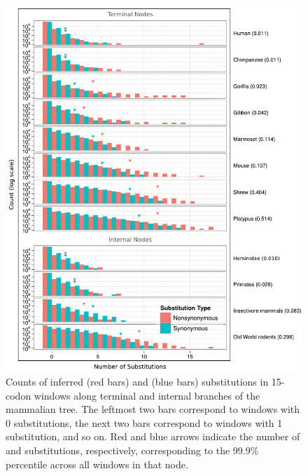 \begin{figure}
\centering \includegraphics[scale=0.75]{Figs/wcs_15.pdf}
\caption{Counts of inferred \nsyn (red bars) and \syn (blue bars)
  substitutions in 15-codon windows along terminal and internal
  branches of the mammalian tree. The leftmost two bars correspond to
  windows with 0 substitutions, the next two bars correspond to
  windows with 1 substitution, and so on. Red and blue arrows indicate
  the number of \nsyn and \syn substitutions, respectively,
  corresponding to the 99.9\% percentile across all windows in that
  node.}
\label{fig_wcs}
\end{figure}

